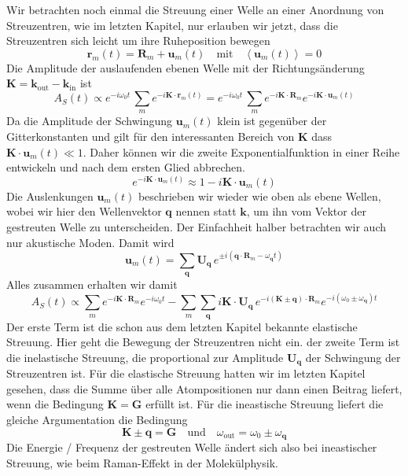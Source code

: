 Wir betrachten noch einmal die Streuung einer Welle an einer Anordnung von Streuzentren, wie im letzten Kapitel, nur erlauben wir jetzt, dass die Streuzentren sich leicht um ihre Ruheposition bewegen
\begin{equation}
\mathbf{r}_m(t) = \mathbf{R}_m + \mathbf{u}_m(t) \quad \text{mit} \quad \left<\mathbf{u}_m(t)\right> = 0
\end{equation}
Die Amplitude der auslaufenden ebenen Welle mit der Richtungsänderung $\mathbf{K} = \mathbf{k}_\text{out} - \mathbf{k}_\text{in}$ ist
\begin{equation}
A_S(t) \propto e^{-i \omega_0 t} \, \sum_m e^{-i \mathbf{K} \cdot \mathbf{r}_m(t)} =
e^{-i \omega_0 t} \, \sum_m e^{-i \mathbf{K} \cdot \mathbf{R}_m}  e^{-i \mathbf{K} \cdot \mathbf{u}_m(t)}
\end{equation}
Da die Amplitude der Schwingung $\mathbf{u}_m(t)$ klein ist gegenüber der Gitterkonstanten und gilt für den interessanten Bereich von $\mathbf{K}$ dass  $\mathbf{K} \cdot\mathbf{u}_m(t) \ll 1 $. Daher können wir die zweite Exponentialfunktion in einer Reihe entwickeln und nach dem ersten Glied abbrechen.
\begin{equation}
 e^{-i \mathbf{K} \cdot \mathbf{u}_m(t)} \approx 1 - i \mathbf{K} \cdot \mathbf{u}_m(t)
\end{equation}
Die Auslenkungen $\mathbf{u}_m(t)$ beschrieben wir wieder wie oben als ebene Wellen, wobei wir hier den Wellenvektor $\mathbf{q}$ nennen statt $\mathbf{k}$, um ihn vom Vektor der gestreuten Welle zu unterscheiden. Der Einfachheit halber betrachten wir auch nur akustische Moden. Damit wird
\begin{equation}
\mathbf{u}_m(t) = \sum_\mathbf{q} \mathbf{U}_\mathbf{q} \, 
e^{ \pm i ( \mathbf{q} \cdot \mathbf{R}_m - \omega_\mathbf{q} t ) }
\end{equation}
Alles zusammen erhalten wir damit
\begin{equation}
A_S(t) \propto 
\sum_m e^{-i \mathbf{K} \cdot \mathbf{R}_m}  
e^{-i \omega_0 t} 
-
\sum_m \sum_\mathbf{q}  i \mathbf{K} \cdot \mathbf{U}_\mathbf{q} \,
 e^{-i (\mathbf{K} \pm \mathbf{q} ) \cdot \mathbf{R}_m}  
e^{-i (\omega_0 \pm \omega_\mathbf{q})  t} 
\end{equation}
Der erste Term ist die schon aus dem letzten Kapitel bekannte elastische Streuung. Hier geht die Bewegung der Streuzentren nicht ein. der zweite Term ist die inelastische Streuung, die proportional zur Amplitude $\mathbf{U}_\mathbf{q}$ der Schwingung der Streuzentren ist. Für die elastische Streuung hatten wir im letzten Kapitel gesehen, dass die Summe über alle Atompositionen nur dann einen Beitrag liefert, wenn die Bedingung $\mathbf{K} = \mathbf{G}$ erfüllt ist. Für die ineastische Streuung liefert die gleiche Argumentation die Bedingung
\begin{equation}
 \mathbf{K} \pm \mathbf{q} = \mathbf{G} \quad \text{und} \quad \omega_\text{out} = \omega_0 \pm \omega_\mathbf{q}
\end{equation}
Die Energie / Frequenz der gestreuten Welle ändert sich also bei ineastischer Streuung, wie beim Raman-Effekt in der Molekülphysik.



